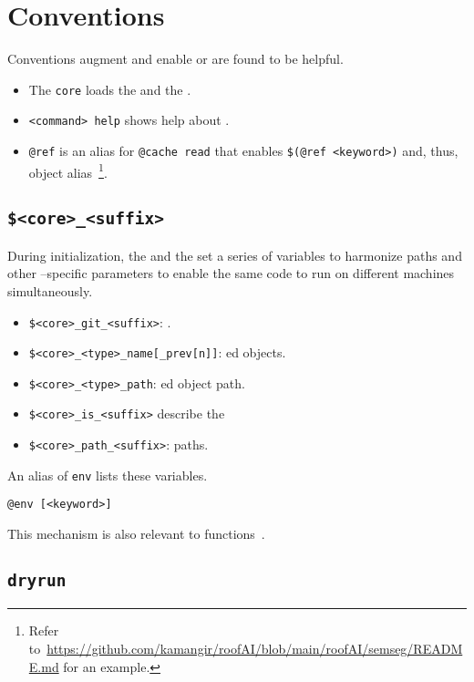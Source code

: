 \section{Conventions}\label{conventions}\label{core}\label{help}

Conventions augment and enable  or are found to be helpful.
%
\begin{itemize}
    \item The \texttt{core} loads the  and  the .
    \item \texttt{<command> help} shows help about .
    \item \texttt{@ref} is an alias for \texttt{@cache read} that enables \texttt{\$(@ref <keyword>)} and, thus, object alias~\footnote{Refer to~\url{https://github.com/kamangir/roofAI/blob/main/roofAI/semseg/README.md} for an example.}.
\end{itemize}  

\subsection{\texttt{\$<core>\_<suffix>}}\label{awareness}

During initialization, the  and the  set a series of variables to harmonize paths and other --specific parameters to enable the same code to run on different machines simultaneously. 
%
\begin{itemize}
    \item{\texttt{\$<core>\_git\_<suffix>}: .}
    \item{\texttt{\$<core>\_<type>\_name[\_prev[n]]}: ed objects.}
    \item{\texttt{\$<core>\_<type>\_path}: ed object path.}
    \item{\texttt{\$<core>\_is\_<suffix>} describe the }
    \item{\texttt{\$<core>\_path\_<suffix>}: paths.}
\end{itemize}
%
An alias of \texttt{env} lists these variables.
%
\begin{verbatim}
@env [<keyword>]
\end{verbatim}

This mechanism is also relevant to functions~\cite{namespaces}.

\subsection{\texttt{dryrun}}\label{dryrun}

